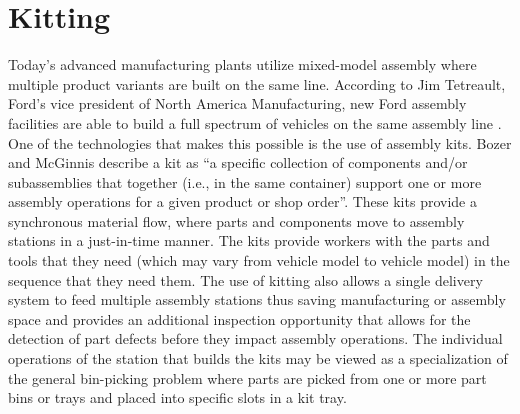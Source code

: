 %
%





%
%
\section{Kitting}
\label{sect:kitting}
Today's advanced manufacturing plants utilize mixed-model assembly where multiple product variants are built on the same line.  
According to Jim Tetreault, Ford’s vice president of North America Manufacturing, 
new Ford assembly facilities are able to build a full spectrum of vehicles on the same assembly line \cite{James2011}. One of the technologies that makes this possible
is the use of assembly kits.  Bozer and McGinnis \cite{Bozer1992} describe a kit as ``a specific
collection of components and/or subassemblies that together (i.e., in the same container) support one or more assembly
operations for a given product or shop order''. These  kits provide a synchronous material flow, where parts and components move to 
assembly stations in a just-in-time manner. The kits provide workers with the parts and tools that they need (which may vary from 
vehicle model to vehicle model) in the sequence that they need them. The use of kitting also allows a single delivery system to feed
multiple assembly stations thus saving manufacturing or assembly space \cite{Medbo2003} and provides an additional inspection opportunity 
that allows for the detection of part defects before they impact assembly operations. The individual operations of the station 
that builds the kits may be viewed as a specialization of the general
bin-picking problem \cite{Schyja2012} where parts are picked from one or more part bins or trays and placed into specific slots in a kit tray.

